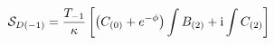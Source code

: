 \begin{equation}
{\cal S}_{D(-1)} =  \frac{T_{-1}}{\kappa} \left[ \left( C_{(0)} +
e^{-\phi}\right) \int B_{(2)} + {\rm i} \int C_{(2)}  \right]
\end{equation}

